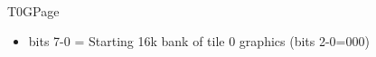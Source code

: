 \\
T0GPage
\begin{itemize}
\item bits 7-0 = Starting 16k bank of tile 0 graphics (bits 2-0=000)
\end{itemize}

